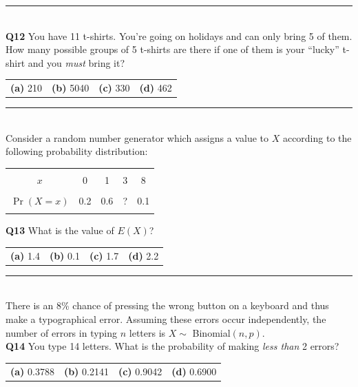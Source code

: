 \documentclass[12pt]{article}
\begin{document}
\rule{\linewidth}{1pt}
\quad\\
{\bf Q12} You have 11 t-shirts. You're going on holidays and can only bring 5 of them. How many possible groups of 5 t-shirts are there if one of them is your ``lucky'' t-shirt and you \emph{must} bring it?\\[0.2cm]
\begin{tabular}{cccc}
{\bf(a)} 210 & {\bf(b)} 5040 & {\bf(c)} 330 & {\bf(d)} 462  \\[0.6cm]
\end{tabular}




\rule{\linewidth}{1pt}
\quad\\
Consider a random number generator which assigns a value to $X$ according to the following probability distribution:
\begin{center}
\begin{tabular}{|c|cccc|}
\hline
&&&&\\[-0.4cm]
$x$        & 0 & 1 & 3 & 8 \\
\hline
&&&&\\[-0.4cm]
$\Pr(X=x)$ & 0.2 & 0.6 & ? & 0.1 \\
\hline
\multicolumn{5}{c}{}
\end{tabular}
\end{center}

{\bf Q13} What is the value of $E(X)$?\\[0.2cm]
\begin{tabular}{cccc}
{\bf(a)} 1.4 & {\bf(b)} 0.1 & {\bf(c)} 1.7 & {\bf(d)} 2.2 \\[0.6cm]
\end{tabular}


\rule{\linewidth}{1pt}
\quad\\
There is an 8\% chance of pressing the wrong button on a keyboard and thus make a typographical error. Assuming these errors occur independently, the number of errors in typing $n$ letters is $X \sim$ Binomial$(n,p)$.\\[0.3cm]

{\bf Q14} You type 14 letters. What is the probability of making \emph{less than} 2 errors? \\[0.2cm]
\begin{tabular}{cccc}
{\bf(a)} 0.3788 & {\bf(b)} 0.2141 & {\bf(c)} 0.9042 & {\bf(d)} 0.6900 \\[0.6cm]
\end{tabular}
\end{document}
